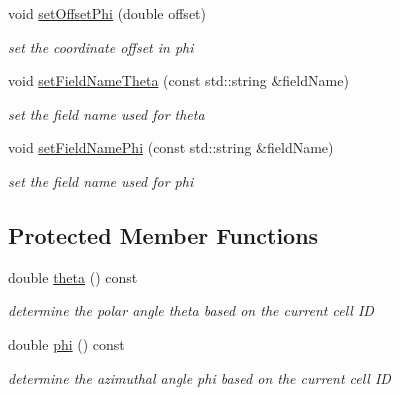 \begin{DoxyCompactItemize}
void \hyperlink{class_d_d4hep_1_1_d_d_segmentation_1_1_projective_cylinder_a0247ee2fcb59209e87206e4f2601b263}{setOffsetPhi} (double offset)
\begin{DoxyCompactList}\small\item\em set the coordinate offset in phi \item\end{DoxyCompactList}\item 
void \hyperlink{class_d_d4hep_1_1_d_d_segmentation_1_1_projective_cylinder_a90249eda202e3bd1fb2c5d8c193549af}{setFieldNameTheta} (const std::string \&fieldName)
\begin{DoxyCompactList}\small\item\em set the field name used for theta \item\end{DoxyCompactList}\item 
void \hyperlink{class_d_d4hep_1_1_d_d_segmentation_1_1_projective_cylinder_ad43fb9ac8d2eb280bdeb465f46f49c28}{setFieldNamePhi} (const std::string \&fieldName)
\begin{DoxyCompactList}\small\item\em set the field name used for phi \item\end{DoxyCompactList}\end{DoxyCompactItemize}
\subsection*{Protected Member Functions}
\begin{DoxyCompactItemize}
\item 
double \hyperlink{class_d_d4hep_1_1_d_d_segmentation_1_1_projective_cylinder_af9bfe1b999161fe989798b29913cba54}{theta} () const 
\begin{DoxyCompactList}\small\item\em determine the polar angle theta based on the current cell ID \item\end{DoxyCompactList}\item 
double \hyperlink{class_d_d4hep_1_1_d_d_segmentation_1_1_projective_cylinder_a923b730c4a4dcd0df3be0372825bab23}{phi} () const 
\begin{DoxyCompactList}\small\item\em determine the azimuthal angle phi based on the current cell ID \item\end{DoxyCompactList}\end{DoxyCompactItemize}
